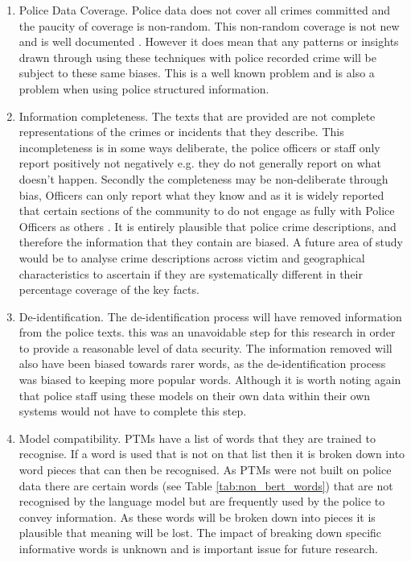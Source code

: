 \begin{enumerate}
    
    \item Police Data Coverage. Police data does not cover all crimes committed and the paucity of coverage is non-random. This non-random coverage is not new and is well documented \parencite{Tarling}. However it does mean that any patterns or insights drawn through using these techniques with police recorded crime will be subject to these same biases. This is a well known problem and is also a problem when using police structured information.
    
    \item Information completeness. The texts that are provided are not complete representations of the crimes or incidents that they describe. This incompleteness is in some ways deliberate, the police officers or staff only report positively not negatively e.g. they do not generally report on what doesn't happen. Secondly the completeness may be non-deliberate through bias, Officers can only report what they know and as it is widely reported that certain sections of the community to do not engage as fully with Police Officers as others \parencite{buil2021accuracy}. It is entirely plausible that police crime descriptions, and therefore the information that they contain are biased. A future area of study would be to analyse crime descriptions across victim and geographical characteristics to ascertain if they are systematically different in their percentage coverage of the key facts.
    
    \item De-identification. The de-identification process will have removed information from the police texts. this was an unavoidable step for this research in order to provide a reasonable level of data security. The information removed will also have been biased towards rarer words, as the de-identification process was biased to keeping more popular words. Although it is worth noting again that police staff using these models on their own data within their own systems would not have to complete this step.
    
    \item Model compatibility. PTMs have a list of words that they are trained to recognise. If a word is used that is not on that list then it is broken down into word pieces that can then be recognised. As PTMs were not built on police data there are certain words (see Table \ref{tab:non_bert_words}) that are not recognised by the language model but are frequently used by the police to convey information. As these words will be broken down into pieces it is plausible that meaning will be lost. The impact of breaking down specific informative words is unknown and is important issue for future research.
    
\end{enumerate}


